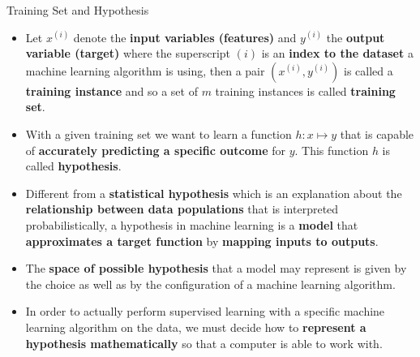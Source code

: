 \documentclass[document.tex]{subfiles}
\begin{document}
    \begin{frame}{Training Set and Hypothesis}
        \begin{itemize}
            \item Let $x^{(i)}$ denote the \textbf{input variables (features)} and $y^{(i)}$ the \textbf{output variable (target)} where the superscript $(i)$ is an \textbf{index to the dataset} a machine learning algorithm is using, then a pair $(x^{(i)}, y^{(i)})$ is called a \textbf{training instance} and so a set of $m$ training instances is called \textbf{training set}.
            \item With a given training set we want to learn a function $h:x \mapsto y$ that is capable of \textbf{accurately predicting a specific outcome} for $y$. This function $h$ is called \textbf{hypothesis}.
            \item Different from a \textbf{statistical hypothesis} which is an explanation about the \textbf{relationship between data populations} that is interpreted probabilistically, a hypothesis in machine learning is a \textbf{model} that \textbf{approximates a target function} by \textbf{mapping inputs to outputs}. 
            \item The \textbf{space of possible hypothesis} that a model may represent is given by the choice as well as by the configuration of a machine learning algorithm.
            \item In order to actually perform supervised learning with a specific machine learning algorithm on the data, we must decide how to \textbf{represent a hypothesis mathematically}  so that a computer is able to work with.
        \end{itemize}
    \end{frame}
\end{document}
